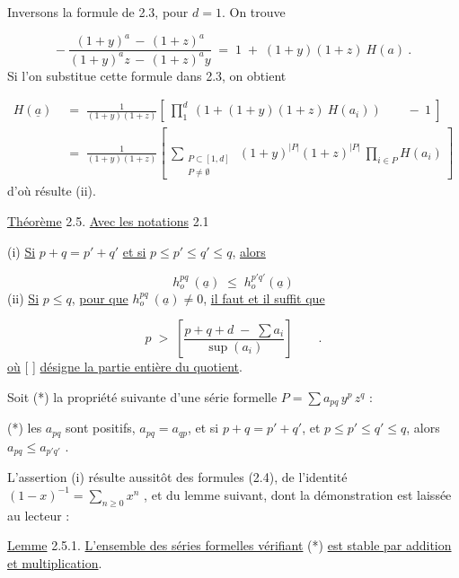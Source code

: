 Inversons la formule de 2.3, pour $d = 1$. On trouve

\begin{equation*}
-\ \frac{(1+y)^{a} \,-\, (1+z)^{a}}{(1+y)^{a}z \,-\, (1+z)^{a}y} \;=\; 1 \;+\; (1+y)(1+z)\ H(a)\ .
\end{equation*}
Si l'on substitue cette formule dans 2.3, on obtient

\begin{equation*}
\begin{aligned}
H(\underline{a}) \;&=\; \frac{1}{(1+y)(1+z)}\left[\ \prod_{1}^{d}\ (1+(1+y)(1+z)\ H(a_{i}))\qquad -\ 1\ \right]\\[2ex]
&=\;\frac{1}{(1+y)(1+z)}\left[\ \sum_{\substack{P \subset [1,d] \\ P \neq \emptyset}}\ (1+y)^{|P|}(1+z)^{|P|}\ \prod_{i \in P} H(a_{i})\ \right]
\end{aligned}
\end{equation*}
d'où résulte (ii).

\underline{Théorème} 2.5. \underline{Avec les notations} 2.1

(i) \quad \underline{Si} $p+q = p'+q'$ \underline{et si} $p \leq p' \leq q' \leq q$, \underline{alors}

\begin{equation*}
h_{o}^{pq}\ (\underline{a}) \;\leq\; h_{o}^{p'q'}(\underline{a})
\end{equation*}
(ii) \quad \underline{Si} $p \leq q$, \underline{pour que} $h_{o}^{pq}\ (\underline{a}) \neq 0$, \underline{il faut et il suffit que} 



\begin{equation*}
 p \;>\; \left[\frac{p+q+d \;-\; \sum a_i}{\sup(a_i)}\right] \qquad .
\end{equation*}
\underline{où} [ ] \underline{désigne la partie entière du quotient}.

Soit (*) la propriété suivante d'une série formelle $P = \sum a_{pq} \, y^p \, z^q$ :

(*)  les $a_{pq}$ sont positifs, $a_{pq} = a_{qp}$, et si $p+q = p'+q'$, et $p \leqslant p' \leqslant q' \leqslant q$, alors $a_{pq} \leqslant a_{p'q'}$ .

L'assertion (i) résulte aussitôt des formules (2.4), de l'identité $(1-x)^{-1} = \sum_{n \geqslant 0} x^n$ , et du lemme suivant, dont la démonstration est laissée au lecteur :

\underline{Lemme} 2.5.1. \underline{L'ensemble des séries formelles vérifiant} (*) \underline{est stable par addition et multiplication}.


